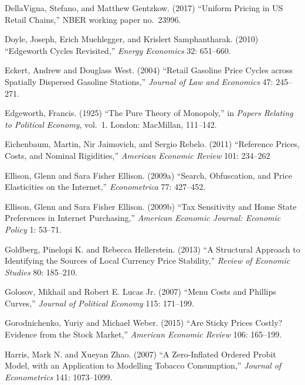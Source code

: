 \documentclass[11pt]{article}
\begin{document}
\begin{description}
\item DellaVigna, Stefano, and Matthew Gentzkow. (2017) ``Uniform Pricing in
US Retail Chains,'' NBER working paper no.~23996.

\item Doyle, Joseph, Erich Muehlegger, and Krislert
  Samphantharak. (2010) ``Edgeworth Cycles Revisited,'' {\em Energy
    Economics} 32: 651--660.

\item Eckert, Andrew and Douglass West. (2004) ``Retail Gasoline Price
  Cycles across Spatially Dispersed Gasoline Stations,'' {\it Journal
    of Law and Economics} 47: 245--271.

\item Edgeworth, Francis. (1925) ``The Pure Theory of Monopoly,'' in
  {\it Papers Relating to Political Economy}, vol.~1. London:
  MacMillan, 111--142.

\item Eichenbaum, Martin, Nir Jaimovich, and Sergio Rebelo. (2011)
  ``Reference Prices, Costs, and Nominal Rigidities,'' {\it American
  Economic Review} 101: 234--262

\item Ellison, Glenn and Sara Fisher Ellison. (2009a) ``Search,
  Obfuscation, and Price Elasticities on the Internet,'' {\it
    Econometrica} 77: 427--452.

\item Ellison, Glenn and Sara Fisher Ellison. (2009b) ``Tax
  Sensitivity and Home State Preferences in Internet Purchasing,''
  {\it American Economic Journal: Economic Policy} 1: 53--71.

\item Goldberg, Pinelopi K. and Rebecca Hellerstein. (2013) ``A
  Structural Approach to Identifying the Sources of Local Currency
  Price Stability,'' {\it Review of Economic Studies} 80: 185--210.

\item Golosov, Mikhail and Robert E. Lucas Jr. (2007) ``Menu Costs and
  Phillips Curves,'' {\it Journal of Political Economy} 115: 171--199.

\item Gorodnichenko, Yuriy and Michael Weber. (2015) ``Are Sticky
  Prices Costly? Evidence from the Stock Market,'' {\it American
    Economic Review} 106: 165--199.

\item Harris, Mark N. and Xueyan Zhao. (2007) ``A Zero-Inflated
  Ordered Probit Model, with an Application to Modelling Tobacco
  Consumption,'' {\it Journal of Econometrics} 141: 1073--1099.


\end{description}
\end{document}
